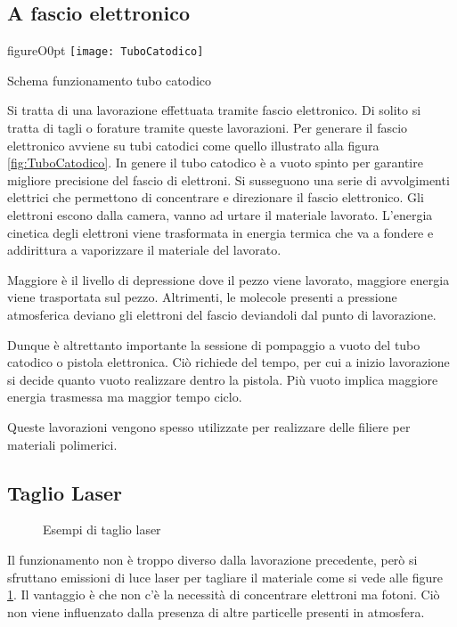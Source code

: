 \subsection{A fascio elettronico}
\begin{wrapfloat}{figure}{O}{0pt}
\texttt{[image: TuboCatodico]}
\caption{Schema funzionamento tubo catodico}
\label{fig:TuboCatodico}
\end{wrapfloat}
Si tratta di una lavorazione effettuata tramite fascio elettronico.
Di solito si tratta di tagli o forature tramite queste lavorazioni.
Per generare il fascio elettronico avviene su tubi catodici come quello illustrato alla figura \ref{fig:TuboCatodico}.
In genere il tubo catodico è a vuoto spinto per garantire migliore precisione del fascio di elettroni.
Si susseguono una serie di avvolgimenti elettrici che permettono di concentrare e direzionare il fascio elettronico.
Gli elettroni escono dalla camera, vanno ad urtare il materiale lavorato.
L'energia cinetica degli elettroni viene trasformata in energia termica che va a fondere e addirittura a vaporizzare il materiale del lavorato.

Maggiore è il livello di depressione dove il pezzo viene lavorato, maggiore energia viene trasportata sul pezzo. Altrimenti, le molecole presenti a pressione atmosferica deviano gli elettroni del fascio deviandoli dal punto di lavorazione.

Dunque è altrettanto importante la sessione di pompaggio a vuoto del tubo catodico o pistola elettronica. Ciò richiede del tempo, per cui a inizio lavorazione si decide quanto vuoto realizzare dentro la pistola. Più vuoto implica maggiore energia trasmessa ma maggior tempo ciclo.

Queste lavorazioni vengono spesso utilizzate per realizzare delle filiere per materiali polimerici.

\subsection{Taglio Laser}
\begin{figure}
\centering
{}\quad
{}
\caption{Esempi di taglio laser}
\label{fig:TaglLaser}
\end{figure}

Il funzionamento non è troppo diverso dalla lavorazione precedente, però si sfruttano emissioni di luce laser per tagliare il materiale come si vede alle figure \ref{fig:TaglLaser}.
Il vantaggio è che non c'è la necessità di concentrare elettroni ma fotoni.
Ciò non viene influenzato dalla presenza di altre particelle presenti in atmosfera.

